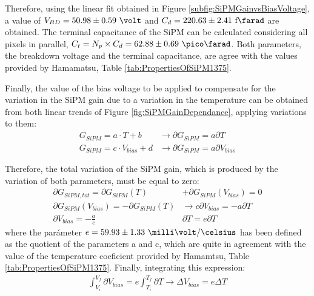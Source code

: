 Therefore, using the linear fit obtained in Figure \ref{subfig:SiPMGainvsBiasVoltage}, a value of $V_{BD}=50.98 \pm 0.59~\volt$ and $C_d{}= 220.63 \pm 2.41~\text{f}\farad$ are obtained. The terminal capacitance of the SiPM can be calculated considering all pixels in parallel, $C_{t}=N_{p}\times C_{d}=62.88 \pm 0.69~\pico\farad$. Both parameters, the breakdown voltage and the terminal capacitance, are agree with the values provided by Hamamatsu, Table \ref{tab:PropertiesOfSiPM1375}. 

Finally, the value of the bias voltage to be applied to compensate for the variation in the SiPM gain due to a variation in the temperature can be obtained from both linear trends of Figure \ref{fig:SiPMGainDependance}, applying variations to them:
\begin{equation*}
\begin{split}
G_{SiPM}=a \cdot{} T + b  &\longrightarrow \partial G_{SiPM}= a \partial T\\
G_{SiPM}=c \cdot{} V_{bias} + d &\longrightarrow \partial G_{SiPM}= a \partial V_{bias}
\label{Gain_compensationVariations}
\end{split}
\end{equation*} 

Therefore, the total variation of the SiPM gain, which is produced by the variation of both parameters, must be equal to zero:
\begin{equation*}
\begin{split}
\partial G_{SiPM, tot}= \partial G_{SiPM}(T) &+ \partial G_{SiPM}(V_{bias}) = 0\\ 
\partial G_{SiPM}(V_{bias}) = -\partial G_{SiPM}(T) &\longrightarrow c \partial V_{bias} = - a \partial T\\ 
\partial V_{bias}  = - \frac{a}{c}&\partial T = e \partial T
\label{Gain_compensation0}
\end{split}
\end{equation*} 
where the parámeter $e= 59.93 \pm 1.33~\milli\volt/\celsius $ has been defined as the quotient of the parameters a and c, which are quite in agreement with the value of the temperature coeficient provided by Hamamtsu, Table \ref{tab:PropertiesOfSiPM1375}. Finally, integrating this expression:
\begin{equation}
\begin{split}
\int_{V_i}^{V_f}\partial V_{bias}  = e\int_{T_i}^{T_f}\partial T \longrightarrow \Delta V_{bias} = e \Delta T
\label{Gain_compensationIntegring}
\end{split}
\end{equation} 

